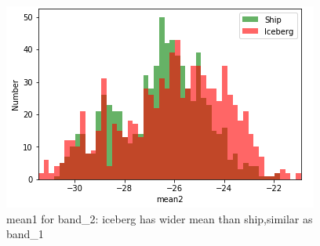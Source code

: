 \documentclass[fleqn,10pt]{SelfArx} %
\begin{document}
\begin{figure}[ht]\centering
\includegraphics[width=\linewidth]{mean2}
\caption{mean1 for band\_2: iceberg has wider mean than ship,similar as band\_1}
\label{fig:mean2}
\end{figure}
\end{document}
